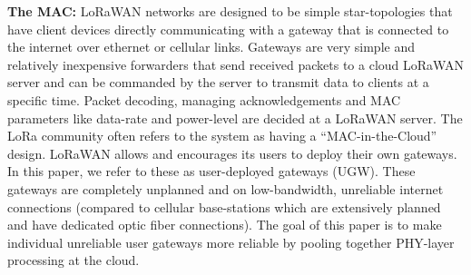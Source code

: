 \vspace*{0.02in}

\noindent \textbf{The MAC: }  LoRaWAN networks
are designed to be simple star-topologies that have client devices directly
communicating with a gateway that is connected to the internet over ethernet
or cellular links. Gateways are very simple and relatively inexpensive forwarders that send received packets to a cloud LoRaWAN server and can be commanded by the server to transmit data to clients at a specific time. Packet decoding, managing acknowledgements and
MAC parameters like data-rate and power-level are decided at a LoRaWAN
server. The LoRa community often refers to the system as having a
``MAC-in-the-Cloud'' design. LoRaWAN allows and encourages its users to deploy their own gateways. In this
paper, we refer to these as user-deployed gateways (UGW). These gateways are
completely unplanned and on low-bandwidth, unreliable internet connections
(compared to cellular base-stations which are extensively planned and have
dedicated optic fiber connections). The goal of this paper is to make individual unreliable user gateways more reliable by pooling together PHY-layer processing at the cloud.  





